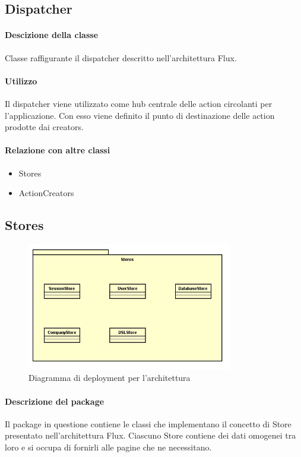 \subsection{Dispatcher}
\paragraph*{Descizione della classe}
Classe raffigurante il dispatcher descritto nell'architettura Flux.
\paragraph*{Utilizzo}
Il dispatcher viene utilizzato come hub centrale delle action circolanti per l'applicazione. Con esso viene definito il punto di destinazione delle action prodotte dai creators.
\paragraph*{Relazione con altre classi}
\begin{itemize}
\item Stores
\item ActionCreators
\end{itemize}


\subsection{Stores}

\begin{figure}[h]
\centering
\includegraphics[width=0.8\textwidth]{res/sections/imgs/stores-diagram.jpg}
\caption{Diagramma di deployment per l'architettura}
\end{figure}

\paragraph*{Descrizione del package}
Il package in questione contiene le classi che implementano il concetto di Store presentato nell'architettura Flux. Ciascuno Store contiene dei dati omogenei tra loro e si occupa di fornirli alle pagine che ne necessitano.
